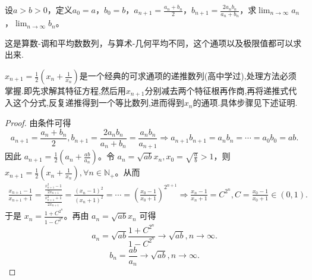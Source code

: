 \documentclass[../../main.tex]{subfiles}
\begin{document}
\begin{example}
设\(a > b>0\)，定义\(a_0 = a\)，\(b_0 = b\)，\(a_{n + 1}=\frac{a_n + b_n}{2}\)，\(b_{n + 1}=\frac{2a_nb_n}{a_n + b_n}\)，求\(\lim_{n\rightarrow\infty}a_n\)，\(\lim_{n\rightarrow\infty}b_n\)。
\end{example}
\begin{remark}
这是算数-调和平均数数列，与算术-几何平均不同，这个通项以及极限值都可以求出来.
\end{remark}\begin{note}
\(x_{n + 1}=\frac{1}{2}\left(x_n+\frac{1}{x_n}\right)\)是一个经典的可求通项的递推数列(高中学过),处理方法必须掌握.即先求解其特征方程,然后用$x_{n+1}$分别减去两个特征根再作商,再将递推式代入这个分式,反复递推得到一个等比数列,进而得到$x_n$的通项.具体步骤见下述证明.
\end{note}
\begin{proof}
由条件可得
\[
a_{n + 1}=\frac{a_n + b_n}{2},b_{n + 1}=\frac{2a_nb_n}{a_n + b_n}=\frac{a_nb_n}{a_{n + 1}}\Rightarrow a_{n + 1}b_{n + 1}=a_nb_n=\cdots =a_0b_0 = ab.
\]
因此 \(a_{n + 1}=\frac{1}{2}\left(a_n+\frac{ab}{a_n}\right)\)。令 \(a_n=\sqrt{ab}x_n,x_0=\sqrt{\frac{a}{b}}>1\)，则 \(x_{n + 1}=\frac{1}{2}\left(x_n+\frac{1}{x_n}\right),\forall n\in \mathbb{N}_+\)。从而
\begin{align*}
\frac{x_{n + 1}-1}{x_{n + 1}+1}=\frac{\frac{x_{n + 1}^2 - 1}{2x_{n + 1}}}{\frac{x_{n + 1}^2 + 1}{2x_{n + 1}}}
=\frac{(x_n - 1)^2}{(x_n + 1)^2}
=\cdots
=\left(\frac{x_0 - 1}{x_0 + 1}\right)^{2^{n + 1}}\Rightarrow \frac{x_n - 1}{x_n + 1}=C^{2^n},C=\frac{x_0 - 1}{x_0 + 1}\in(0,1).
\end{align*}
于是 \(x_n=\frac{1 + C^{2^n}}{1 - C^{2^n}}\)。再由 \(a_n=\sqrt{ab}x_n\) 可得
\[
a_n=\sqrt{ab}\frac{1 + C^{2^n}}{1 - C^{2^n}}\rightarrow\sqrt{ab},n\rightarrow\infty.
\]
\[
b_n=\frac{ab}{a_n}\rightarrow\sqrt{ab},n\rightarrow\infty.
\]
\end{proof}
\end{document}
